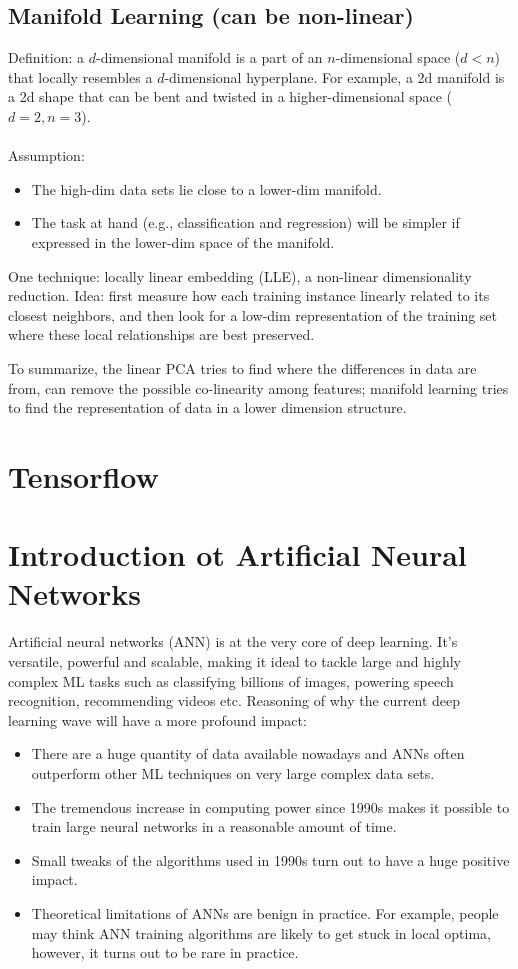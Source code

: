 \documentclass[12pt,oneside,a4paper]{article}
\numberwithin{equation}{section}
\begin{document}
\subsection{Manifold Learning (can be non-linear)}
Definition: a $d$-dimensional manifold is a part of an $n$-dimensional space ($d < n$) that locally resembles a $d$-dimensional hyperplane. For example, a 2d manifold is a 2d shape that can be bent and twisted in a higher-dimensional space ($d = 2, n = 3$).
\\~\\
Assumption: 
\begin{itemize}
\item The high-dim data sets lie close to a lower-dim manifold. 
\item The task at hand (e.g., classification and regression) will be simpler if expressed in the lower-dim space of the manifold.
\end{itemize}

One technique: locally linear embedding (LLE), a non-linear dimensionality reduction. Idea: first measure how each training instance linearly related to its closest neighbors, and then look for a low-dim representation of the training set where these local relationships are best preserved.


To summarize, the linear PCA tries to find where the differences in data are from, can remove the possible co-linearity among features; manifold learning tries to find the representation of data in a lower dimension structure.
\section{Tensorflow}

\section{Introduction ot Artificial Neural Networks}

Artificial neural networks (ANN) is at the very core of deep learning. It's versatile, powerful and scalable, making it ideal to tackle large and highly complex ML tasks such as classifying billions of images, powering speech recognition, recommending videos etc. Reasoning of why the current deep learning wave will have a more profound impact: 

\begin{itemize}
\item There are a huge quantity of data available nowadays and ANNs often outperform other ML techniques on very large complex data sets. 
\item The tremendous increase in computing power since 1990s makes it possible to train large neural networks in a reasonable amount of time.

\item Small tweaks of the algorithms used in 1990s turn out to have a huge positive impact. 

\item Theoretical limitations of ANNs are benign in practice. For example, people may think ANN training algorithms are likely to get stuck in local optima, however, it turns out to be rare in practice.  
\end{itemize}
\end{document}
